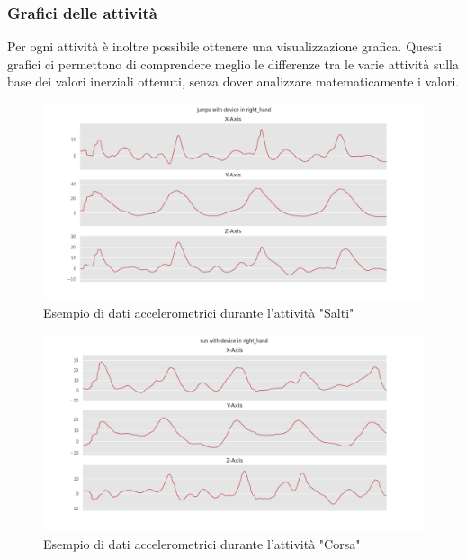 \subsubsection{Grafici delle attività}
Per ogni attività è inoltre possibile ottenere una visualizzazione grafica. Questi grafici ci permettono di comprendere meglio le differenze 
tra le varie attività sulla base dei valori inerziali ottenuti, senza dover analizzare matematicamente i valori.

\begin{figure}[H]
    \centering
    \includegraphics[scale = 0.45]{assets/images/classifications/accelerometer/right_hand/jumps-right-hand-acc.png}
    \caption{Esempio di dati accelerometrici durante l'attività "Salti"}
\end{figure}
\begin{figure}[H]
    \centering
    \includegraphics[scale = 0.45]{assets/images/classifications/accelerometer/right_hand/run-right-hand-acc.png}
    \caption{Esempio di dati accelerometrici durante l'attività "Corsa"}
\end{figure}
